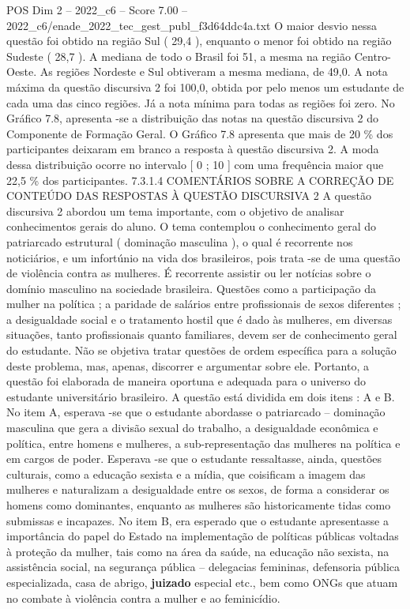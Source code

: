 \begin{textsample}{POS Dim 2 – 2022\_c6 – Score 7.00 – 2022\_c6/enade\_2022\_tec\_gest\_publ\_f3d64ddc4a.txt}
O maior desvio nessa questão foi obtido na região Sul ( 29,4 ), enquanto o menor foi obtido na região Sudeste ( 28,7 ).
A mediana de todo o Brasil foi 51, a mesma na região Centro-Oeste.
As regiões Nordeste e Sul obtiveram a mesma mediana, de 49,0.
A nota máxima da questão discursiva 2 foi 100,0, obtida por pelo menos um estudante de cada uma das cinco regiões.
Já a nota mínima para todas as regiões foi zero.
No Gráfico 7.8, apresenta -se a distribuição das notas na questão discursiva 2 do Componente de Formação Geral.
O Gráfico 7.8 apresenta que mais de 20 \% dos participantes deixaram em branco a resposta à questão discursiva 2.
A moda dessa distribuição ocorre no intervalo [ 0 ; 10 ] com uma frequência maior que 22,5 \% dos participantes. 7.3.1.4 COMENTÁRIOS SOBRE A CORREÇÃO DE CONTEÚDO DAS RESPOSTAS À QUESTÃO DISCURSIVA 2 A questão discursiva 2 abordou um tema importante, com o objetivo de analisar conhecimentos gerais do aluno.
O tema contemplou o conhecimento geral do patriarcado estrutural ( dominação masculina ), o qual é recorrente nos noticiários, e um infortúnio na vida dos brasileiros, pois trata -se de uma questão de violência contra as mulheres.
É recorrente assistir ou ler notícias sobre o domínio masculino na sociedade brasileira.
Questões como a participação da mulher na política ; a paridade de salários entre profissionais de sexos diferentes ; a desigualdade social e o tratamento hostil que é dado às mulheres, em diversas situações, tanto profissionais quanto familiares, devem ser de conhecimento geral do estudante.
Não se objetiva tratar questões de ordem específica para a solução deste problema, mas, apenas, discorrer e argumentar sobre ele.
Portanto, a questão foi elaborada de maneira oportuna e adequada para o universo do estudante universitário brasileiro.
A questão está dividida em dois itens : A e B.
No item A, esperava -se que o estudante abordasse o patriarcado – dominação masculina que gera a divisão sexual do trabalho, a desigualdade econômica e política, entre homens e mulheres, a sub-representação das mulheres na política e em cargos de poder.
Esperava -se que o estudante ressaltasse, ainda, questões culturais, como a educação sexista e a mídia, que coisificam a imagem das mulheres e naturalizam a desigualdade entre os sexos, de forma a considerar os homens como dominantes, enquanto as mulheres são historicamente tidas como submissas e incapazes.
No item B, era esperado que o estudante apresentasse a importância do papel do Estado na implementação de políticas públicas voltadas à proteção da mulher, tais como na área da saúde, na educação não sexista, na assistência social, na segurança pública – delegacias femininas, defensoria pública especializada, casa de abrigo, \textbf{juizado} especial etc., bem como ONGs que atuam no combate à violência contra a mulher e ao feminicídio.

\end{textsample}
